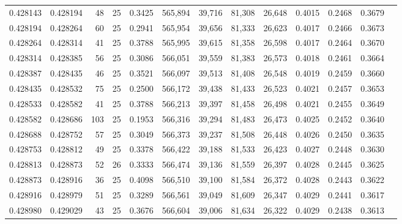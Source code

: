 \begin{tabular}{rrrrrrrrrrrrr}
0.428143 & 0.428194 &    48 &  25 &                                     0.3425 & 565,894 &  39,716 &  81,308 &  26,648 & 0.4015 & 0.2468 & 0.3679 \\
0.428194 & 0.428264 &    60 &  25 &                                     0.2941 & 565,954 &  39,656 &  81,333 &  26,623 & 0.4017 & 0.2466 & 0.3673 \\
0.428264 & 0.428314 &    41 &  25 &                                     0.3788 & 565,995 &  39,615 &  81,358 &  26,598 & 0.4017 & 0.2464 & 0.3670 \\
0.428314 & 0.428385 &    56 &  25 &                                     0.3086 & 566,051 &  39,559 &  81,383 &  26,573 & 0.4018 & 0.2461 & 0.3664 \\
0.428387 & 0.428435 &    46 &  25 &                                     0.3521 & 566,097 &  39,513 &  81,408 &  26,548 & 0.4019 & 0.2459 & 0.3660 \\
0.428435 & 0.428532 &    75 &  25 &                                     0.2500 & 566,172 &  39,438 &  81,433 &  26,523 & 0.4021 & 0.2457 & 0.3653 \\
0.428533 & 0.428582 &    41 &  25 &                                     0.3788 & 566,213 &  39,397 &  81,458 &  26,498 & 0.4021 & 0.2455 & 0.3649 \\
0.428582 & 0.428686 &   103 &  25 &                                     0.1953 & 566,316 &  39,294 &  81,483 &  26,473 & 0.4025 & 0.2452 & 0.3640 \\
0.428688 & 0.428752 &    57 &  25 &                                     0.3049 & 566,373 &  39,237 &  81,508 &  26,448 & 0.4026 & 0.2450 & 0.3635 \\
0.428753 & 0.428812 &    49 &  25 &                                     0.3378 & 566,422 &  39,188 &  81,533 &  26,423 & 0.4027 & 0.2448 & 0.3630 \\
0.428813 & 0.428873 &    52 &  26 &                                     0.3333 & 566,474 &  39,136 &  81,559 &  26,397 & 0.4028 & 0.2445 & 0.3625 \\
0.428873 & 0.428916 &    36 &  25 &                                     0.4098 & 566,510 &  39,100 &  81,584 &  26,372 & 0.4028 & 0.2443 & 0.3622 \\
0.428916 & 0.428979 &    51 &  25 &                                     0.3289 & 566,561 &  39,049 &  81,609 &  26,347 & 0.4029 & 0.2441 & 0.3617 \\
0.428980 & 0.429029 &    43 &  25 &                                     0.3676 & 566,604 &  39,006 &  81,634 &  26,322 & 0.4029 & 0.2438 & 0.3613 \\

\end{tabular}
